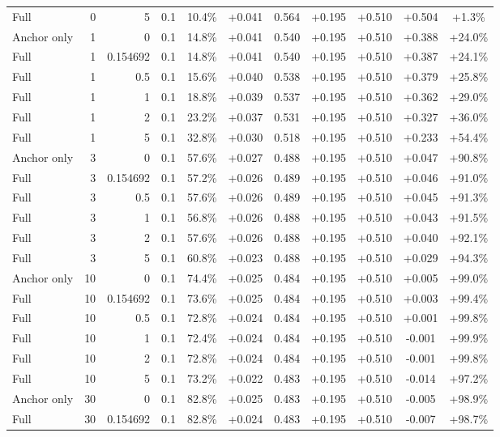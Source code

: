 \begin{table}[htbp]
\begin{tabular}{lrrrccccccc}
Full & 0 & 5 & 0.1 & 10.4\% & +0.041 & 0.564 & +0.195 & +0.510 & +0.504 & +1.3\% \\
Anchor only & 1 & 0 & 0.1 & 14.8\% & +0.041 & 0.540 & +0.195 & +0.510 & +0.388 & +24.0\% \\
Full & 1 & 0.154692 & 0.1 & 14.8\% & +0.041 & 0.540 & +0.195 & +0.510 & +0.387 & +24.1\% \\
Full & 1 & 0.5 & 0.1 & 15.6\% & +0.040 & 0.538 & +0.195 & +0.510 & +0.379 & +25.8\% \\
Full & 1 & 1 & 0.1 & 18.8\% & +0.039 & 0.537 & +0.195 & +0.510 & +0.362 & +29.0\% \\
Full & 1 & 2 & 0.1 & 23.2\% & +0.037 & 0.531 & +0.195 & +0.510 & +0.327 & +36.0\% \\
Full & 1 & 5 & 0.1 & 32.8\% & +0.030 & 0.518 & +0.195 & +0.510 & +0.233 & +54.4\% \\
Anchor only & 3 & 0 & 0.1 & 57.6\% & +0.027 & 0.488 & +0.195 & +0.510 & +0.047 & +90.8\% \\
Full & 3 & 0.154692 & 0.1 & 57.2\% & +0.026 & 0.489 & +0.195 & +0.510 & +0.046 & +91.0\% \\
Full & 3 & 0.5 & 0.1 & 57.6\% & +0.026 & 0.489 & +0.195 & +0.510 & +0.045 & +91.3\% \\
Full & 3 & 1 & 0.1 & 56.8\% & +0.026 & 0.488 & +0.195 & +0.510 & +0.043 & +91.5\% \\
Full & 3 & 2 & 0.1 & 57.6\% & +0.026 & 0.488 & +0.195 & +0.510 & +0.040 & +92.1\% \\
Full & 3 & 5 & 0.1 & 60.8\% & +0.023 & 0.488 & +0.195 & +0.510 & +0.029 & +94.3\% \\
Anchor only & 10 & 0 & 0.1 & 74.4\% & +0.025 & 0.484 & +0.195 & +0.510 & +0.005 & +99.0\% \\
Full & 10 & 0.154692 & 0.1 & 73.6\% & +0.025 & 0.484 & +0.195 & +0.510 & +0.003 & +99.4\% \\
Full & 10 & 0.5 & 0.1 & 72.8\% & +0.024 & 0.484 & +0.195 & +0.510 & +0.001 & +99.8\% \\
Full & 10 & 1 & 0.1 & 72.4\% & +0.024 & 0.484 & +0.195 & +0.510 & -0.001 & +99.9\% \\
Full & 10 & 2 & 0.1 & 72.8\% & +0.024 & 0.484 & +0.195 & +0.510 & -0.001 & +99.8\% \\
Full & 10 & 5 & 0.1 & 73.2\% & +0.022 & 0.483 & +0.195 & +0.510 & -0.014 & +97.2\% \\
Anchor only & 30 & 0 & 0.1 & 82.8\% & +0.025 & 0.483 & +0.195 & +0.510 & -0.005 & +98.9\% \\
Full & 30 & 0.154692 & 0.1 & 82.8\% & +0.024 & 0.483 & +0.195 & +0.510 & -0.007 & +98.7\% \\

\end{tabular}
\end{table}
